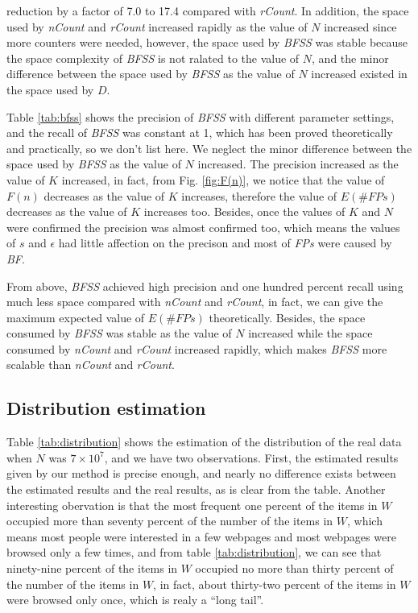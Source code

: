 \documentclass[conference]{IEEEtran}
\begin{document}
reduction by a factor of 7.0 to 17.4 compared with \emph{rCount}. In addition, the space used by \emph{nCount} and \emph{rCount} increased rapidly as the value of $N$ increased since more counters were needed, however, the space used by \emph{BFSS} was stable because the space complexity of \emph{BFSS} is not ralated to the value of $N$, and the minor difference between the space used by \emph{BFSS} as the value of $N$ increased existed in the space used by $D$.\par
Table \ref{tab:bfss} shows the precision of \emph{BFSS} with different parameter settings, and the recall of \emph{BFSS} was constant at 1, which has been proved theoretically and practically, so we don't list here. We neglect the minor difference between the space used by \emph{BFSS} as the value of $N$ increased. The precision increased as the value of $K$ increased, in fact, from Fig. \ref{fig:F(n)}, we notice that the value of $F(n)$ decreases as the value of $K$ increases, therefore the value of $E(\#FPs)$ decreases as the value of $K$ increases too. Besides, once the values of $K$ and $N$ were confirmed the precision was almost confirmed too, which means the values of $s$ and $\epsilon$ had little affection on the precison and most of \emph{FPs} were caused by \emph{BF}.\par
From above, \emph{BFSS} achieved high precision and one hundred percent recall using much less space compared with \emph{nCount} and \emph{rCount}, in fact, we can give the maximum expected value of $E(\#FPs)$ theoretically. Besides, the space consumed by \emph{BFSS} was stable as the value of $N$ increased while the space consumed by \emph{nCount} and \emph{rCount} increased rapidly, which makes \emph{BFSS} more scalable than \emph{nCount} and \emph{rCount}.
\subsection{Distribution estimation}
Table \ref{tab:distribution} shows the estimation of the distribution of the real data when $N$ was $7\times10^7$, and we have two observations. First, the estimated results given by our method is precise enough, and nearly no difference exists between the estimated results and the real results, as is clear from the table. Another interesting obervation is that the most frequent one percent of the items in $W$ occupied more than seventy percent of the number of the items in $W$, which means most people were interested in a few webpages and most webpages were browsed only a few times, and from table \ref{tab:distribution}, we can see that ninety-nine percent of the items in $W$ occupied no more than thirty percent of the number of the items in $W$, in fact, about thirty-two percent of the items in $W$ were browsed only once, which is realy a ``long tail''.
\end{document}
